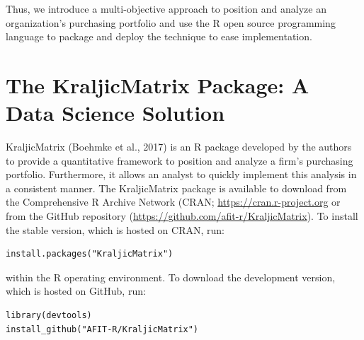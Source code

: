 \documentclass[twocolumn]{svjour3}       %
\begin{document}
Thus, we introduce a multi-objective approach to position and analyze an organization's purchasing portfolio and use the R open source programming language to package and deploy the technique to ease implementation.


\section{The KraljicMatrix Package: A Data Science Solution}
\label{sec:4}

KraljicMatrix (Boehmke et al., 2017) is an R package developed by the authors to provide a quantitative framework to position and analyze a firm's purchasing portfolio. Furthermore, it allows an analyst to quickly implement this analysis in a consistent manner. The KraljicMatrix package is available to download from the Comprehensive R Archive Network (CRAN; \url{https://cran.r-project.org} or from the GitHub repository (\url{https://github.com/afit-r/KraljicMatrix}). To install the stable version, which is hosted on CRAN, run:
\begin{verbatim}
install.packages("KraljicMatrix")
\end{verbatim}
within the R operating environment. To download the development version, which is hosted on GitHub, run:
\begin{verbatim}
library(devtools)
install_github("AFIT-R/KraljicMatrix")
\end{verbatim}
\end{document}
